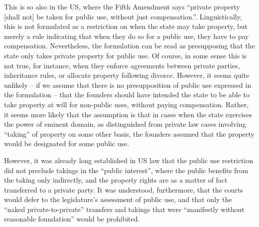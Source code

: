 This is so also in the US, where the Fifth Amendment says ``private property [shall not] be taken for public use, without just compensation.”.  Linguistically, this is not formulated as a restriction on when the state may take property, but merely a rule indicating that when they do so for a public use, they have to pay compensation. Nevertheless, the formulation can be read as presupposing that the state only takes private property for public use. Of course, in some sense this is not true, for instance, when they enforce agreements between private parties, inheritance rules, or allocate property following divorce. However, it seems quite unlikely -- if we assume that there is no presupposition of public use expressed in the formulation -- that the founders should have intended the state to be able to take property at will for non-public uses, without paying compensation. Rather, it seems more likely that the assumption is that in cases when the state exercises the power of eminent domain, as distinguished from private law cases involving ``taking'' of property on some other basis, the founders assumed that the property would be designated for some public use.

However, it was already long established in US law that the public use restriction did not preclude takings in the ``public interest'', where the public benefits from the taking only indirectly, and the property rights are as a matter of fact transferred to a private party. It was understood, furthermore, that the courts would defer to the legislature's assessment of public use, and that only the ``naked private-to-private'' transfers and takings that were ``manifestly without reasonable foundation'' would be prohibited. 